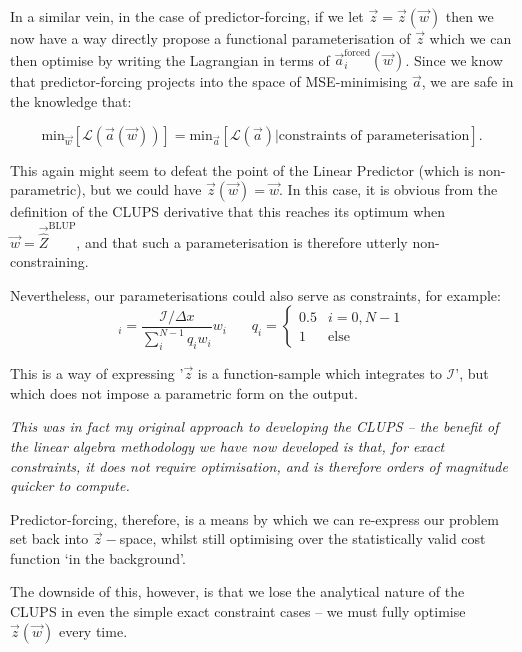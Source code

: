 \documentclass[]{article}
\begin{document}
		In a similar vein, in the case of predictor-forcing, if we let $\vec{z} = \vec{z}(\vec{w})$ then we now have a way directly propose a functional parameterisation of $\vec{z}$ which we can then optimise by writing the Lagrangian in terms of $\vec{a}_i^\text{forced}(\vec{w})$. Since we know that predictor-forcing projects into the space of MSE-minimising $\vec{a}$, we are safe in the knowledge that:
		
		\begin{equation}
			\text{min}_{\vec{w}}\left[\mathcal{L}(\vec{a}(\vec{w}))\right] = \text{min}_{\vec{a}}\left[\mathcal{L}(\vec{a})|\text{constraints of parameterisation}\right].
		\end{equation}
		
		This again might seem to defeat the point of the Linear Predictor (which is non-parametric), but we could have $\vec{z}(\vec{w}) = \vec{w}$. In this case, it is obvious from the definition of the CLUPS derivative that this reaches its optimum when $\vec{w} = \vec{\hat{Z}}^\text{BLUP}$, and that such a parameterisation is therefore utterly non-constraining.
		
		Nevertheless, our parameterisations could also serve as constraints, for example:
		\begin{equation}
			[\vec{z}(\vec{w})]_i = \frac{\mathcal{I}/\Delta x}{\sum_i^{N-1} q_i w_i} w_i ~~~~~~~~q_i = \begin{cases} 0.5 & i = 0,  N-1 \\ 1 & \text{else} \end{cases}
		\end{equation}

		This is a way of expressing '$\vec{z}$ is a function-sample which integrates to $\mathcal{I}$', but which does not impose a parametric form on the output. 
		
		{\it This was in fact my original approach to developing the CLUPS -- the benefit of the linear algebra methodology we have now developed is that, for exact constraints, it does not require optimisation, and is therefore orders of magnitude quicker to compute.}

		Predictor-forcing, therefore, is a means by which we can re-express our problem set back into $\vec{z}-$space, whilst still optimising over the statistically valid cost function `in the background'.

		The downside of this, however, is that we lose the analytical nature of the CLUPS in even the simple exact constraint cases -- we must fully optimise $\vec{z}(\vec{w})$ every time. 
\end{document}

